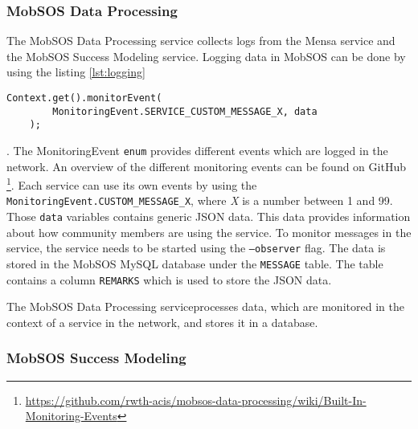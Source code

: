 \subsubsection{MobSOS Data Processing}
The MobSOS Data Processing service collects logs from the Mensa service and the MobSOS Success Modeling service. 
Logging data in MobSOS can be done by using the listing \ref{lst:logging}
\begin{lstlisting}[caption=Example use of a MonitoringEvent,captionpos=b,label={lst:logging}]
    Context.get().monitorEvent(
        MonitoringEvent.SERVICE_CUSTOM_MESSAGE_X, data
    );
\end{lstlisting}.
The MonitoringEvent \texttt{enum} provides different events which are logged in the network. An overview of the different monitoring events can be found on GitHub \footnote{\url{https://github.com/rwth-acis/mobsos-data-processing/wiki/Built-In-Monitoring-Events}}. 
Each service can use its own events by using the \texttt{MonitoringEvent.CUSTOM\_MESSAGE\_X}, where \emph{X} is a number between 1 and 99. 
Those \texttt{data} variables contains generic JSON data. This data provides information about how community members are using the service.
To monitor messages in the service, the service needs to be started using the \texttt{--observer} flag.
The data is stored in the MobSOS MySQL database under the \texttt{MESSAGE} table. The table contains a column \texttt{REMARKS} which is used to store the JSON data.

The MobSOS Data Processing service\footnotemark processes data, which are monitored in the context of a service in the network, and stores it in a database.



\subsubsection{MobSOS Success Modeling}

